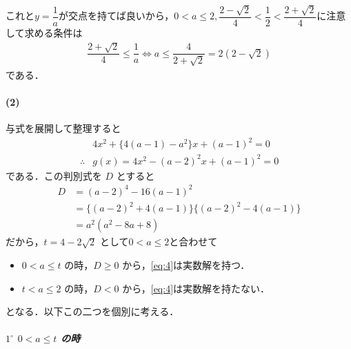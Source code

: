 \documentclass[../../main.tex]{subfiles}
\begin{document}
これと$y=\dfrac{1}{a}$が交点を持てば良いから，$0 < a \le 2, \dfrac{2-\sqrt{2}}{4} < \dfrac{1}{2} < \dfrac{2+\sqrt{2}}{4}$に注意して求める条件は
\begin{align}
  \dfrac{2+\sqrt{2}}{4} \le \dfrac{1}{a} \iff a \le \dfrac{4}{2+\sqrt{2}} = 2(2-\sqrt{2})
\end{align}
である．

\paragraph{(2)}

与式を展開して整理すると
\begin{align}
  & 4x^2 + \{4(a-1)-a^2\}x + (a-1)^2 = 0 \\
  \therefore
  & g(x) = 4x^2 - (a-2)^2 x + (a-1)^2 = 0 \label{eq:4}
\end{align}
である．この判別式を $D$ とすると
\begin{align}
  D
  & = (a-2)^4 - 16(a-1)^2 \\
  & = \{(a-2)^2 + 4(a-1)\}\{(a-2)^2 - 4(a-1)\} \\
  & = a^2(a^2-8a+8)
\end{align}
だから，$t = 4-2\sqrt{2}$ として$0 < a \le 2$と合わせて
\begin{itemize}
  \item $0 < a \le t$ の時，$D \ge 0$ から，\cref{eq:4}は実数解を持つ．\\
  \item $t < a \le 2$ の時，$ D<0$ から，\cref{eq:4}は実数解を持たない．
\end{itemize}
となる．以下この二つを個別に考える．

\subparagraph{$1^\circ$ $0 < a \le t$ の時}
\end{document}
